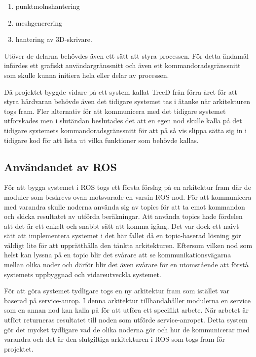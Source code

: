 \begin{enumerate}
	\item punktmolnshantering
	
	\item meshgenerering
	
	\item hantering av 3D-skrivare.
\end{enumerate}

Utöver de delarna behövdes även ett sätt att styra processen. För detta ändamål infördes ett grafiskt användargränssnitt och även ett kommandoradsgränssnitt som skulle kunna initiera hela eller delar av processen.

Då projektet byggde vidare på ett system kallat TreeD från förra året för att styra hårdvaran behövde även det tidigare systemet tas i åtanke när arkitekturen togs fram. Fler alternativ för att kommunicera med det tidigare systemet utforskades men i slutändan beslutades det att en egen nod skulle kalla på det tidigare systemets kommandoradsgränssnitt för att på så vis slippa sätta sig in i tidigare kod för att lista ut vilka funktioner som behövde kallas.

\subsection{Användandet av ROS}

För att bygga systemet i ROS togs ett första förslag på en arkitektur fram där de moduler som beskrevs ovan motsvarade en varsin ROS-nod. För att kommunicera med varandra skulle noderna använda sig av topics för att ta emot kommandon och skicka resultatet av utförda beräkningar. Att använda topics hade fördelen att det är ett enkelt och snabbt sätt att komma igång. Det var dock ett naivt sätt att implementera systemet i det här fallet då en topic-baserad lösning gör väldigt lite för att upprätthålla den tänkta arkitekturen. Eftersom vilken nod som helst kan lyssna på en topic blir det svårare att se kommunikationsvägarna mellan olika noder och därför blir det även svårare för en utomstående att förstå systemets uppbyggnad och vidareutveckla systemet.

För att göra systemet tydligare togs en ny arkitektur fram som istället var baserad på service-anrop. I denna arkitektur tillhandahåller modulerna en service som en annan nod kan kalla på för att utföra ett specifikt arbete. När arbetet är utfört returneras resultatet till noden som utförde service-anropet. Detta system gör det mycket tydligare vad de olika noderna gör och hur de kommunicerar med varandra och det är den slutgiltiga arkitekturen i ROS som togs fram för projektet.


